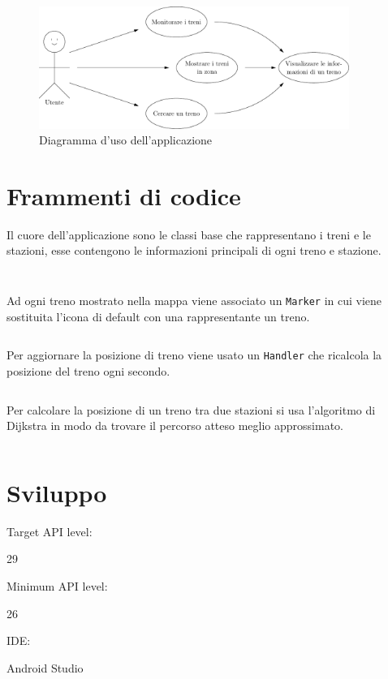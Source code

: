 \documentclass[a4paper,10pt]{article}
\begin{document}
  \begin{figure}[h!]
    \centering
    \includegraphics[width=0.9\textwidth]{asy/use_case_diagram}
    \caption{Diagramma d'uso dell'applicazione}
  \end{figure}

\pagebreak

\section{Frammenti di codice}
  Il cuore dell'applicazione sono le classi base che rappresentano i treni e le stazioni, esse contengono le informazioni principali di ogni treno e stazione.

  \medskip
  \begin{minipage}[t]{0.45\textwidth}
    \inputminted{java}{snippet/Train.java}
  \end{minipage}
  \hfill
  \begin{minipage}[t]{0.45\textwidth}
    \inputminted{java}{snippet/Station.java}
  \end{minipage}

  \medskip
  \noindent
  Ad ogni treno mostrato nella mappa viene associato un \texttt{Marker} in cui viene sostituita l'icona di default con una rappresentante un treno.
  \inputminted{java}{snippet/Marker.java}

  \medskip
  \noindent
  Per aggiornare la posizione di treno viene usato un \texttt{Handler} che ricalcola la posizione del treno ogni secondo.
  \inputminted{java}{snippet/Scheduler.java}

  \medskip
  \noindent
  Per calcolare la posizione di un treno tra due stazioni si usa l'algoritmo di Dijkstra in modo da trovare il percorso atteso meglio approssimato.
  \inputminted[fontsize=\footnotesize]{java}{snippet/Dijkstra.java}

\section{Sviluppo}
  \parbox{4cm}{Target API level:}    29 \\
  \parbox{4cm}{Minimum API level:}   26 \\
  \parbox{4cm}{IDE:}                 Android Studio
\end{document}
